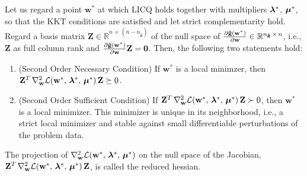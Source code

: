 \begin{theorem}
Let us regard a point $\mathbf{w}^*$ at which LICQ holds together with multipliers $\bm{\gmultiplier}^*$, $\bm{\hmultiplier}^*$, so that the KKT conditions are satisfied and let strict complementarity hold. Regard a basis matrix $\mathbf{Z} \in \mathbb{R}^{n\,\times\,(n-n_{\mathbf{\tilde{g}}})}$ of the null space of $\pdv{\mathbf{\tilde{g}}(\mathbf{w}^*)}{\mathbf{w}} \in \mathbb{R}^{n_{\mathbf{\tilde{g}}}\,\times\,n}$, i.e., $\mathbf{Z}$ as full column rank and $\pdv{\mathbf{\tilde{g}}(\mathbf{w}^*)}{\mathbf{w}} \mathbf{Z} = \mathbf{0}$. Then, the following two statements hold:

\begin{enumerate}
\item (Second Order Necessary Condition) If $\mathbf{w}^*$ is a local minimzer, then $\mathbf{Z}^T \, \nabla_\mathbf{w}^2 \lagrangian{\mathbf{w}^*,\,\bm{\gmultiplier}^*,\,\bm{\hmultiplier}^*} \, \mathbf{Z} \succeq 0$.\\
\item (Second Order Sufficient Condition) If $\mathbf{Z}^T \, \nabla_\mathbf{w}^2 \lagrangian{\mathbf{w}^*,\,\bm{\gmultiplier}^*,\,\bm{\hmultiplier}^*} \, \mathbf{Z} \succ 0$, then $\mathbf{w}^*$ is a local minimizer. This minimizer is unique in its neighborhood, i.e., a strict local minimizer and stable against small differentiable perturbations of the problem data.
\end{enumerate}

\label{theorem:sooc}
\end{theorem}

\begin{definition}
The projection of $\nabla_\mathbf{w}^2 \lagrangian{\mathbf{w}^*,\,\bm{\gmultiplier}^*,\,\bm{\hmultiplier}^*}$ on the null space of the Jacobian, $\mathbf{Z}^T \, \nabla_\mathbf{w}^2 \lagrangian{\mathbf{w}^*,\,\bm{\gmultiplier}^*,\,\bm{\hmultiplier}^*} \, \mathbf{Z}$, is called the reduced hessian.
\end{definition}

